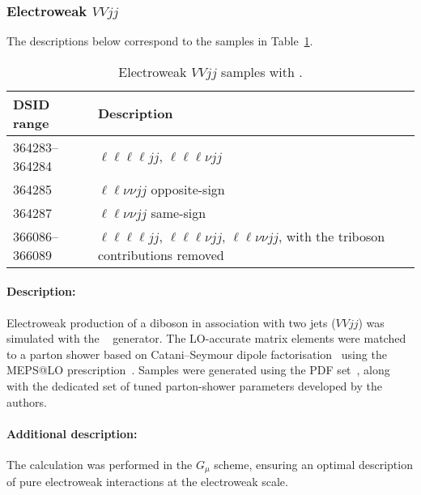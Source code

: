 


\subsubsection[Electroweak VVjj]{Electroweak $VVjj$}

The descriptions below correspond to the samples in
Table~\ref{tab:MB-sherpa-vvjj}.

\begin{table}[htbp]
  \caption{Electroweak $VVjj$ samples with \SHERPA.}%
  \label{tab:MB-sherpa-vvjj}
  \centering
  \begin{tabular}{l l}
    \toprule
    DSID range & Description \\
    \midrule
    364283--364284   & $\ell\ell\ell\ell jj$, $\ell\ell\ell\nu jj$\\
    364285   &  $\ell\ell\nu\nu jj$ opposite-sign\\
    364287   &  $\ell\ell\nu\nu jj$ same-sign\\
    366086--366089   &  $\ell\ell\ell\ell jj$, $\ell\ell\ell\nu jj$, $\ell\ell\nu\nu jj$, with the triboson contributions removed\\
    \bottomrule
  \end{tabular}
\end{table}

\paragraph{Description:}

Electroweak production of a diboson in association with two jets
($VVjj$) was simulated with the \SHERPA[2.2.2]~\cite{Bothmann:2019yzt}
generator. The LO-accurate matrix elements were matched to a parton
shower based on Catani--Seymour dipole factorisation~\cite{Gleisberg:2008fv,Schumann:2007mg} using the MEPS@LO
prescription~\cite{Hoeche:2011fd,Hoeche:2012yf,Catani:2001cc,Hoeche:2009rj}.
Samples were generated using the \NNPDF[3.0nnlo] PDF set~\cite{Ball:2014uwa},
along with the dedicated set of tuned parton-shower parameters
developed by the \SHERPA authors.

\paragraph{Additional description:} The calculation was performed in the
$G_\mu$ scheme, ensuring an optimal description of pure
electroweak interactions at the electroweak scale.

